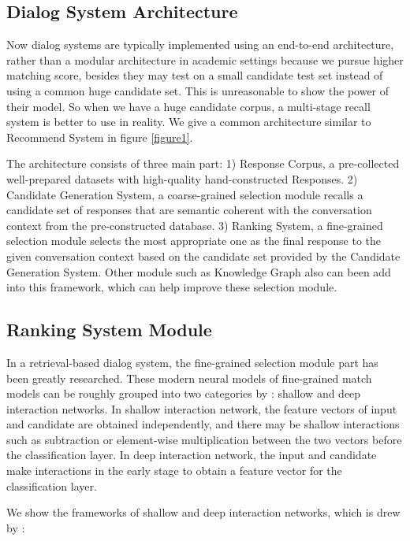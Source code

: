 \documentclass{article}
\begin{document}
\subsection{Dialog System Architecture}

Now dialog systems are typically implemented using an end-to-end architecture, rather than a modular architecture in academic settings because we pursue higher matching score, besides they may test on a small candidate test set instead of using a common huge candidate set. This is unreasonable to show the power of their model. So when we have a huge candidate corpus, a multi-stage recall system is better to use in reality. We give a common architecture similar to Recommend System in figure \ref{figure1}.

The architecture consists of three main part: 1) Response Corpus, a pre-collected well-prepared datasets with high-quality hand-constructed Responses. 2) Candidate Generation System, a coarse-grained selection module recalls a candidate set of responses that are semantic coherent with the conversation context from the pre-constructed database. 3) Ranking System, a fine-grained selection module selects the most appropriate one as the final response to the given conversation context based on the candidate set provided by the Candidate Generation System. Other module such as Knowledge Graph also can been add into this framework, which can help improve these selection module.

\subsection{Ranking System Module}

In a retrieval-based dialog system, the fine-grained selection module part has been greatly researched. These modern neural models of fine-grained match models can be roughly grouped into two categories by \cite{huang2020challenges}: shallow and deep interaction networks. In shallow interaction network, the feature vectors of input and candidate are obtained independently, and there may be shallow interactions such as subtraction or element-wise multiplication between the two vectors before the classification layer. In deep interaction network, the input and candidate make interactions in the early stage to obtain a feature vector for the classification layer.

We show the frameworks of shallow and deep interaction networks, which is drew by \cite{huang2020challenges}:
\end{document}
